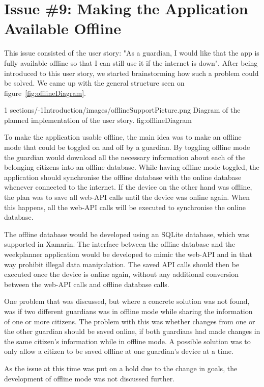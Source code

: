 \section{Issue \#9: Making the Application Available Offline}
\label{sect:OfflineSupportFirstUserStory}
This issue consisted of the user story: "As a guardian, I would like that the app is fully available offline so that I can still use it if the internet is down".
After being introduced to this user story, we started brainstorming how such a problem could be solved. We came up with the general structure seen on figure~\ref{fig:offlineDiagram}.

        {1} %
        {sections/-1Introduction/images/offlineSupportPicture.png} %
        {Diagram of the planned implementation of the user story.} %
        {fig:offlineDiagram} %

To make the application usable offline, the main idea was to make an offline mode that could be toggled on and off by a guardian. By toggling offline mode the guardian would download all the necessary information about each of the belonging citizens into an offline database. While having offline mode toggled, the application should synchronise the offline database with the online database whenever connected to the internet. If the device on the other hand was offline, the plan was to save all web-API calls until the device was online again. When this happens, all the web-API calls will be executed to synchronise the online database. 

The offline database would be developed using an SQLite database, which was supported in Xamarin. The interface between the offline database and the weekplanner application would be developed to mimic the web-API and in that way prohibit illegal data manipulation. The saved API calls should then be executed once the device is online again, without any additional conversion between the web-API calls and offline database calls.

One problem that was discussed, but where a concrete solution was not found, was if two different guardians was in offline mode while sharing the information of one or more citizens. 
The problem with this was whether changes from one or the other guardian should be saved online, if both guardians had made changes in the same citizen's information while in offline mode. 
A possible solution was to only allow a citizen to be saved offline at one guardian's device at a time.

As the issue at this time was put on a hold due to the change in goals, the development of offline mode was not discussed further.